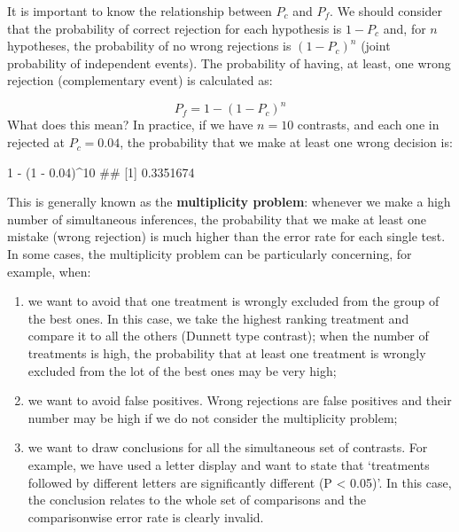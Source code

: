 \documentclass[a4paper,12pt,oneside]{book}
\providecommand{\tightlist}{%
  \setlength{\itemsep}{0pt}\setlength{\parskip}{0pt}}
\newenvironment{Shaded}{\begin{snugshade}}{\end{snugshade}}
\newcommand{\DecValTok}[1]{#1}
\newcommand{\FloatTok}[1]{#1}
\newcommand{\SpecialCharTok}[1]{#1}
\newcommand{\DocumentationTok}[1]{#1}
\newcommand{\NormalTok}[1]{#1}
\begin{document}
It is important to know the relationship between \(P_c\) and \(P_f\). We should consider that the probability of correct rejection for each hypothesis is \(1 - P_c\) and, for \(n\) hypotheses, the probability of no wrong rejections is \((1 - P_c)^n\) (joint probability of independent events). The probability of having, at least, one wrong rejection (complementary event) is calculated as:

\[P_f = 1 - (1 - P_c)^n\]
What does this mean? In practice, if we have \(n = 10\) contrasts, and each one in rejected at \(P_c = 0.04\), the probability that we make at least one wrong decision is:

\begin{Shaded}
\begin{Highlighting}[]
\DecValTok{1} \SpecialCharTok{{-}}\NormalTok{ (}\DecValTok{1} \SpecialCharTok{{-}} \FloatTok{0.04}\NormalTok{)}\SpecialCharTok{\^{}}\DecValTok{10}
\DocumentationTok{\#\# [1] 0.3351674}
\end{Highlighting}
\end{Shaded}

This is generally known as the \textbf{multiplicity problem}: whenever we make a high number of simultaneous inferences, the probability that we make at least one mistake (wrong rejection) is much higher than the error rate for each single test. In some cases, the multiplicity problem can be particularly concerning, for example, when:

\begin{enumerate}
\def\labelenumi{\arabic{enumi}.}
\tightlist
\item
  we want to avoid that one treatment is wrongly excluded from the group of the best ones. In this case, we take the highest ranking treatment and compare it to all the others (Dunnett type contrast); when the number of treatments is high, the probability that at least one treatment is wrongly excluded from the lot of the best ones may be very high;
\item
  we want to avoid false positives. Wrong rejections are false positives and their number may be high if we do not consider the multiplicity problem;
\item
  we want to draw conclusions for all the simultaneous set of contrasts. For example, we have used a letter display and want to state that `treatments followed by different letters are significantly different (P \textless{} 0.05)'. In this case, the conclusion relates to the whole set of comparisons and the comparisonwise error rate is clearly invalid.
\end{enumerate}
\end{document}
